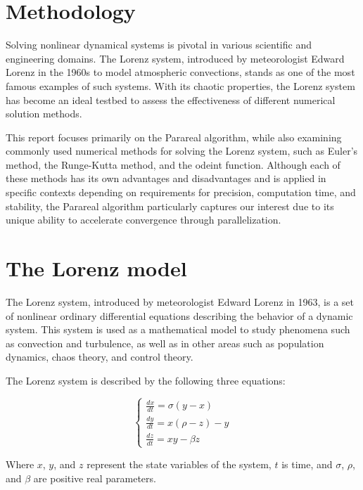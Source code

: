 \documentclass{article}
\begin{document}
    \section{Methodology}
 
    Solving nonlinear dynamical systems is pivotal in various scientific and engineering domains. The Lorenz system, introduced by meteorologist Edward Lorenz in the 1960s to model atmospheric convections, stands as one of the most famous examples of such systems. With its chaotic properties, the Lorenz system has become an ideal testbed to assess the effectiveness of different numerical solution methods.
    
    This report focuses primarily on the Parareal algorithm, while also examining commonly used numerical methods for solving the Lorenz system, such as Euler's method, the Runge-Kutta method, and the odeint function. Although each of these methods has its own advantages and disadvantages and is applied in specific contexts depending on requirements for precision, computation time, and stability, the Parareal algorithm particularly captures our interest due to its unique ability to accelerate convergence through parallelization.
    
    \section{The Lorenz model}
   
   
    The Lorenz system\cite{lorenz1963deterministic}, introduced by meteorologist Edward Lorenz in 1963, 
    is a set of nonlinear ordinary differential equations describing the behavior of a dynamic system. 
    This system is used as a mathematical model to study phenomena such as convection and turbulence, 
    as well as in other areas such as population dynamics, chaos theory, and control theory.
   
   
   
    The Lorenz system is described by the following three equations:
   
    \[
   \left\{
   \begin{array}{ccc}
   \frac{dx}{dt} = \sigma(y - x) \\
   \frac{dy}{dt} = x(\rho - z) - y \\
   \frac{dz}{dt} = xy - \beta z
   \end{array}
   \right.
   \]
   
   Where $x$, $y$, and $z$ represent the state variables of the system, 
   $t$ is time, and $\sigma$, $\rho$, and $\beta$ are positive real parameters.
   
\end{document}
